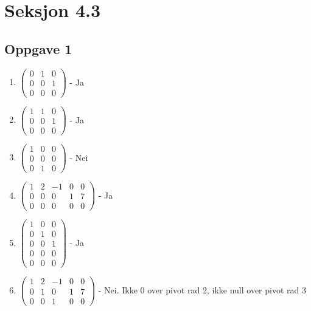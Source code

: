 \documentclass{article}
\begin{document}
\newpage
\section*{Seksjon 4.3}
\subsection*{Oppgave 1}
\begin{enumerate}[A=]

    \item $\begin{pmatrix}
        0&1&0\\0&0&1\\0&0&0
    \end{pmatrix}$
     - Ja

\vspace{5em}

     \item $\begin{pmatrix}
         1&1&0\\0&0&1\\0&0&0
     \end{pmatrix}$
     - Ja

\vspace{5em}

     \item $\begin{pmatrix}
         1&0&0\\0&0&0\\0&1&0
     \end{pmatrix}$
     - Nei

\vspace{5em}

     \item $\begin{pmatrix}
         1&2&-1&0&0\\0&0&0&1&7\\0&0&0&0&0
     \end{pmatrix}$
     - Ja

\vspace{5em}

     \item $\begin{pmatrix}
         1&0&0\\0&1&0\\0&0&1\\0&0&0\\0&0&0
     \end{pmatrix}$
     - Ja

\vspace{5em}

     \item $\begin{pmatrix}
         1&2&-1&0&0\\0&1&0&1&7\\0&0&1&0&0
     \end{pmatrix}$
     - Nei. Ikke 0 over pivot rad 2, ikke null over pivot rad 3
     
\vspace{5em}

\end{enumerate}
\end{document}
